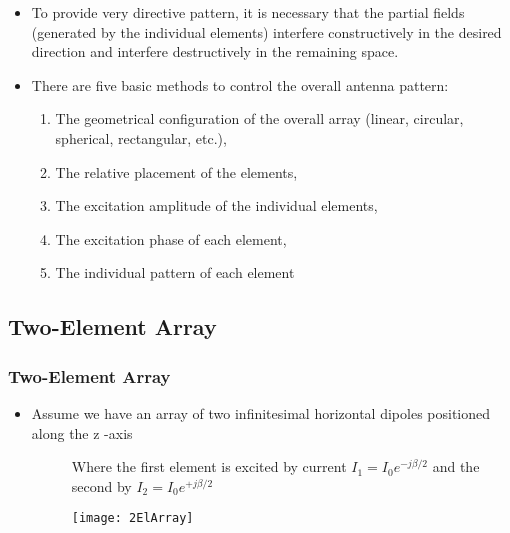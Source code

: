 \documentclass{beamer}
\begin{document}
	\begin{frame}
		\begin{itemize}
			\item To provide very directive pattern, it is necessary that the partial fields (generated by the individual elements) interfere \color{blue}constructively \color{black}in the desired direction and interfere \color{blue}destructively \color{black}
			in the remaining space.
			\item There are five basic methods to control the overall antenna pattern:
			\begin{enumerate}
				\item The geometrical configuration of the overall array (linear, circular,
				spherical, rectangular, etc.),
				\item The relative placement of the elements,
				\item The excitation amplitude of the individual elements,
				\item The excitation phase of each element,
				\item The individual pattern of each element
			\end{enumerate}
		\end{itemize}
	\end{frame}
	\begin{frame}
		\section{Two-Element Array}
		\frametitle{Two-Element Array}
		\begin{itemize}
			\item Assume we have an array of two infinitesimal horizontal dipoles positioned
			along the z -axis
			\begin{description}
				\item[] Where the first element is excited by current $ I_1 = I_0 e^ {−j\beta/2} $ and the second by $ I_2 = I_0 e^{+j\beta/2} $
			\end{description}
			\begin{figure}
				\centering
				\texttt{[image: 2ElArray]}
			\end{figure}
		\end{itemize}
	\end{frame}
\end{document}
